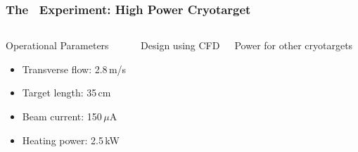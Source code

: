 \begin{frame}
 \frametitle{The \Qweak\ Experiment: High Power Cryotarget}
 \begin{columns}[T]
   \begin{block}{Operational Parameters}
    \begin{itemize}
     \item Transverse flow: 2.8\,m/s
     \item Target length: 35\,cm
     \item Beam current: 150\,$\mu$A
     \item Heating power: \alert{2.5\,kW}
    \end{itemize}
   \end{block}
   \begin{block}{Design using CFD}
    \centerline{}
   \end{block}
   \begin{block}{Power for other cryotargets}
    \centerline{}
    \centerline{}
   \end{block}
 \end{columns}
\end{frame}

